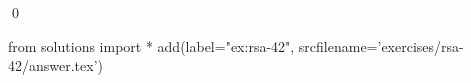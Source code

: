 
\begin{ex} 
  \label{ex:rsa-42}
  
  \qed
\end{ex} 
\begin{python0}
from solutions import *
add(label="ex:rsa-42",
    srcfilename='exercises/rsa-42/answer.tex') 
\end{python0}
